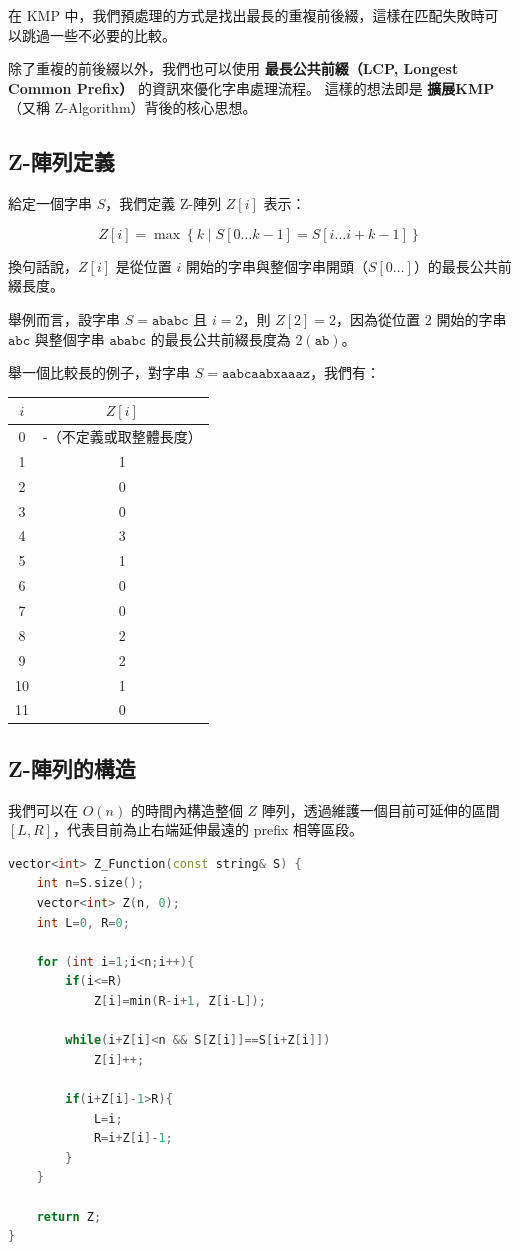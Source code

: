 
在 KMP 中，我們預處理的方式是找出最長的重複前後綴，這樣在匹配失敗時可以跳過一些不必要的比較。

除了重複的前後綴以外，我們也可以使用 \textbf{最長公共前綴（LCP, Longest Common Prefix）} 的資訊來優化字串處理流程。
這樣的想法即是 \textbf{擴展KMP}（又稱 Z-Algorithm）背後的核心思想。    

\subsection{Z-陣列定義}

給定一個字串 $S$，我們定義 Z-陣列 $Z[i]$ 表示：

$$
Z[i] = \max \left\{ k \mid S[0 \ldots k-1] = S[i \ldots i+k-1] \right\}
$$

換句話說，$Z[i]$ 是從位置 $i$ 開始的字串與整個字串開頭（$S[0\ldots]$）的最長公共前綴長度。

舉例而言，設字串 $S=\texttt{ababc}$ 且 $i=2$，則 $Z[2] = 2$，因為從位置 $2$ 開始的字串 $\texttt{abc}$ 
與整個字串 $\texttt{ababc}$ 的最長公共前綴長度為 $2(\texttt{ab})$。

舉一個比較長的例子，對字串 $S = \texttt{aabcaabxaaaz}$，我們有：

\begin{center}
\begin{tabular}{c|c}
$i$ & $Z[i]$ \\
\hline
0 & -（不定義或取整體長度）\\
1 & 1 \\
2 & 0 \\
3 & 0 \\
4 & 3 \\
5 & 1 \\
6 & 0 \\
7 & 0 \\
8 & 2 \\
9 & 2 \\
10 & 1 \\
11 & 0 \\
\end{tabular}
\end{center}

\subsection{Z-陣列的構造}

我們可以在 $O(n)$ 的時間內構造整個 $Z$ 陣列，透過維護一個目前可延伸的區間 $[L, R]$，代表目前為止右端延伸最遠的 prefix 相等區段。

\begin{lstlisting}[language=C++]
vector<int> Z_Function(const string& S) {
    int n=S.size();
    vector<int> Z(n, 0);
    int L=0, R=0;

    for (int i=1;i<n;i++){
        if(i<=R)
            Z[i]=min(R-i+1, Z[i-L]);

        while(i+Z[i]<n && S[Z[i]]==S[i+Z[i]])
            Z[i]++;

        if(i+Z[i]-1>R){
            L=i;
            R=i+Z[i]-1;
        }
    }

    return Z;
}
\end{lstlisting}


